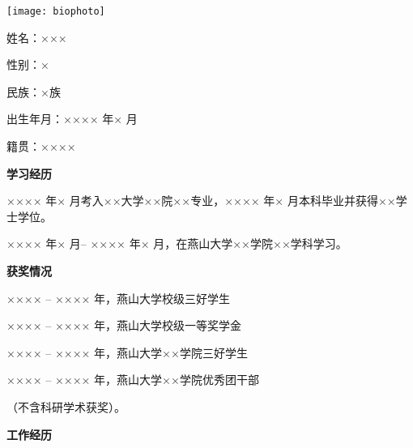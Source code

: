 \begin{resume}
\vspace*{\baselineskip}
\noindent
\begin{minipage}[t]{4cm}
\vspace{-\baselineskip}
\texttt{[image: biophoto]}
\end{minipage}%
\hfill%
\begin{minipage}[t]{10cm}
\vspace{-\baselineskip}
姓\qquad 名：×××

性\qquad 别：×

民\qquad 族：×族

出生年月：×××× 年× 月

籍\qquad 贯：××××
\end{minipage}
\vspace*{\baselineskip}

\textbf{学习经历}   %

×××× 年× 月考入××大学××院××专业，×××× 年× 月本科毕业并获得××学士学位。

×××× 年× 月-- ×××× 年× 月，在燕山大学××学院××学科学习。

\textbf{获奖情况}   %

×××× -- ×××× 年，燕山大学校级三好学生

×××× -- ×××× 年，燕山大学校级一等奖学金

×××× -- ×××× 年，燕山大学××学院三好学生

×××× -- ×××× 年，燕山大学××学院优秀团干部

（不含科研学术获奖）。

\textbf{工作经历}   %

\end{resume}
